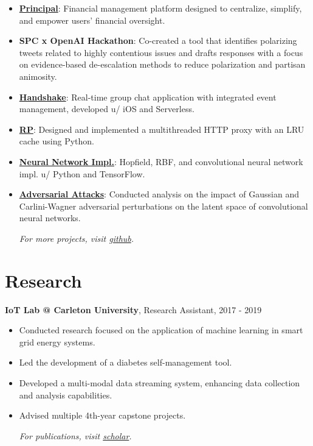 \begin{itemize}
    \item \textbf{\href{https://withprincipal.com}{Principal}}: Financial management platform designed to centralize, simplify, and empower users' financial oversight.


    \item\textbf{SPC x OpenAI Hackathon}:
        Co-created a tool that identifies polarizing tweets related to highly contentious issues and drafts responses with a focus on evidence-based de-escalation methods to reduce polarization and partisan animosity.

    \noindent
        \setlength\itemsep{0em}
        \item \textbf{\href{https://github.com/boshd/handshake}{Handshake}}: Real-time group chat application with integrated event management, developed u/ iOS and Serverless.

        \item \textbf{\href{https://github.com/boshd/rp}{RP}}: Designed and implemented a multithreaded HTTP proxy with an LRU cache using Python.

        \item \textbf{\href{https://github.com/boshd/neuralnets}{Neural Network Impl.}}: Hopfield, RBF, and convolutional neural network impl. u/ Python and TensorFlow.

        \item \textbf{\href{https://github.com/boshd/advatck}{Adversarial Attacks}}: Conducted analysis on the impact of Gaussian and Carlini-Wagner adversarial perturbations on the latent space of convolutional neural networks.

    \textit{For more projects, visit \href{https://github.com/boshd}{github}.}

\end{itemize}

\section*{Research}
\textbf{IoT Lab @ Carleton University}, Research Assistant, 2017 - 2019
\begin{itemize}
        \setlength\itemsep{0em}
        \item Conducted research focused on the application of machine learning in smart grid energy systems.
        \item Led the development of a diabetes self-management tool.
        \item Developed a multi-modal data streaming system, enhancing data collection and analysis capabilities.
        \item Advised multiple 4th-year capstone projects.

    \textit{For publications, visit \href{https://scholar.google.ca/citations?user=zFDREhgAAAAJ\&hl=en}{scholar}.}
\end{itemize}


